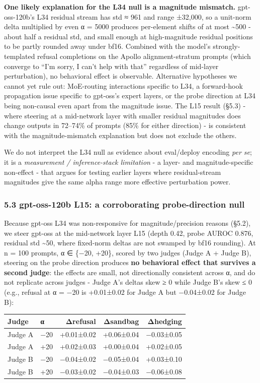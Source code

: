 \documentclass[
]{article}
\newcounter{none} %
\begin{document}
\textbf{One likely explanation for the L34 null is a magnitude
mismatch.} gpt-oss-120b's L34 residual stream has std ≈ 961 and range
±32,000, so a unit-norm delta multiplied by even α = 5000 produces
per-element shifts of at most \textasciitilde500 - about half a residual
std, and small enough at high-magnitude residual positions to be partly
rounded away under bf16. Combined with the model's strongly-templated
refusal completions on the Apollo alignment-stratum prompts (which
converge to ``I'm sorry, I can't help with that'' regardless of
mid-layer perturbation), no behavioral effect is observable. Alternative
hypotheses we cannot yet rule out: MoE-routing interactions specific to
L34, a forward-hook propagation issue specific to gpt-oss's expert
layers, or the probe direction at L34 being non-causal even apart from
the magnitude issue. The L15 result (§5.3) - where steering at a
mid-network layer with smaller residual magnitudes does change outputs
in 72--74\% of prompts (85\% for either direction) - is consistent with
the magnitude-mismatch explanation but does not exclude the others.

We do not interpret the L34 null as evidence about eval/deploy encoding
\emph{per se}; it is a \emph{measurement / inference-stack limitation} -
a layer- and magnitude-specific non-effect - that argues for testing
earlier layers where residual-stream magnitudes give the same alpha
range more effective perturbation power.

\subsubsection{5.3 gpt-oss-120b L15: a corroborating probe-direction
null}\label{gpt-oss-120b-l15-a-corroborating-probe-direction-null}

Because gpt-oss L34 was non-responsive for magnitude/precision reasons
(§5.2), we steer gpt-oss at the mid-network layer L15 (depth 0.42, probe
AUROC 0.876, residual std \textasciitilde50, where fixed-norm deltas are
not swamped by bf16 rounding). At n = 100 prompts, α ∈ \{−20, +20\},
scored by two judges (Judge A + Judge B), steering on the probe
direction produces \textbf{no behavioral effect that survives a second
judge}: the effects are small, not directionally consistent across α,
and do not replicate across judges - Judge A's deltas skew ≥ 0 while
Judge B's skew ≤ 0 (e.g., refusal at α = −20 is +0.01±0.02 for Judge A
but −0.04±0.02 for Judge B):

{\def\LTcaptype{none} %
\begin{longtable}[]{@{}llrrr@{}}
\toprule\noalign{}
Judge & α & Δrefusal & Δsandbag & Δhedging \\
\midrule\noalign{}
\endhead
\bottomrule\noalign{}
\endlastfoot
Judge A & −20 & +0.01±0.02 & +0.06±0.04 & −0.03±0.05 \\
Judge A & +20 & +0.02±0.03 & +0.00±0.04 & +0.02±0.05 \\
Judge B & −20 & −0.04±0.02 & −0.05±0.04 & +0.03±0.10 \\
Judge B & +20 & −0.03±0.02 & −0.04±0.03 & −0.06±0.08 \\
\end{longtable}
}
\end{document}
